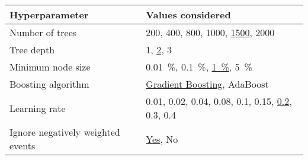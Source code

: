 \begin{tabular}{ll}
  \toprule
  Hyperparameter & Values considered \\
  \midrule
  Number of trees & 200, 400, 800, 1000, \underline{1500}, 2000 \\[0.1em]
  Tree depth & 1, \underline{2}, 3 \\[0.1em]
  Minimum node size & \SI{0.01}{\percent}, \SI{0.1}{\percent}, \underline{\SI{1}{\percent}}, \SI{5}{\percent} \\[0.1em]
  Boosting algorithm & \underline{Gradient Boosting}, AdaBoost \\[0.1em]
  Learning rate & 0.01, 0.02, 0.04, 0.08, 0.1, 0.15, \underline{0.2}, 0.3, 0.4 \\[0.1em]
  Ignore negatively weighted events & \underline{Yes}, No \\
  \bottomrule
\end{tabular}

